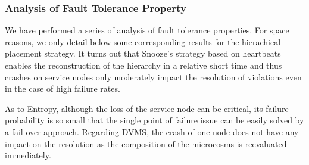 

\subsubsection{Analysis of Fault Tolerance Property}
\label{subsubsec:node-crashes}
We have performed a series of analysis of fault tolerance
properties. For space reasons, we only detail below some corresponding
results for the hierachical placement strategy. It turns out that
Snooze's strategy based on heartbeats enables the reconstruction of
the hierarchy in a relative short time and thus crashes on service
nodes only moderately impact the resolution of violations even in the
case of high failure rates.

As to Entropy, although the loss of the service node can be critical,
its failure probability is so small that the single point of failure
issue can be easily solved by a fail-over approach.  Regarding DVMS,
the crash of one node does not have any impact on the resolution as
the composition of the microcosms is reevaluated immediately.



